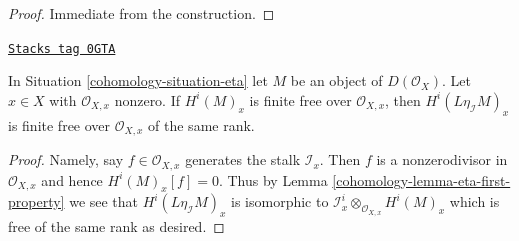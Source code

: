 \begin{proof}
Immediate from the construction.
\end{proof}

\begin{lemma}
\label{cohomology-lemma-eta-cohomology-locally-free}
\href{https://stacks.math.columbia.edu/tag/0GTA}{\texttt{Stacks tag 0GTA}}

In Situation \ref{cohomology-situation-eta} let $M$ be an object of $D(\mathcal{O}_X)$.
Let $x \in X$ with $\mathcal{O}_{X, x}$ nonzero. If $H^i(M)_x$
is finite free over $\mathcal{O}_{X, x}$, then $H^i(L\eta_\mathcal{I}M)_x$
is finite free over $\mathcal{O}_{X, x}$ of the same rank.
\end{lemma}

\begin{proof}

Namely, say $f \in \mathcal{O}_{X, x}$ generates the stalk $\mathcal{I}_x$.
Then $f$ is a nonzerodivisor in $\mathcal{O}_{X, x}$ and hence
$H^i(M)_x[f] = 0$. Thus by
Lemma \ref{cohomology-lemma-eta-first-property}
we see that $H^i(L\eta_\mathcal{I}M)_x$
is isomorphic to
$\mathcal{I}^i_x \otimes_{\mathcal{O}_{X, x}} H^i(M)_x$
which is free of the same rank as desired.
\end{proof}



